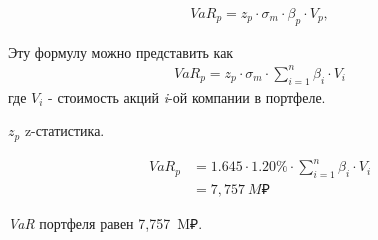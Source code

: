 \documentclass[12pt, table, twoside, a4paper]{exam}
\begin{document}
\begin{questions}
	\begin{solution}[4em]
		
		\raggedright
		\begin{align}
		VaR_p=z_{p}\cdot \sigma_m\cdot  \beta_p\cdot  V_p,
		\end{align}
		
		Эту формулу можно представить как
		\begin{align}
		VaR_p=z_p \cdot \sigma_m \cdot \sum_{i=1}^n\beta_i \cdot V_i
		\end{align}
		где
		$V_i$ - стоимость акций \textit{i}-ой компании в портфеле.
	
		$z_p$ z-статистика.	
		
		\begin{align*}
			VaR_p&=1.645 \cdot 1.20\% \cdot \sum_{i=1}^n\beta_i \cdot V_i\\
			&=7,757~M₽
		\end{align*}

		\textit{VaR }портфеля равен 7,757~M₽.
	\end{solution}
	
\end{questions}
\end{document}
